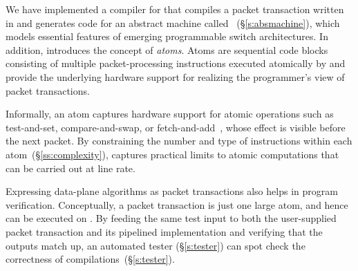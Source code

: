 We have implemented a compiler for \pktlanguage that compiles a packet
transaction written in \pktlanguage and generates code for an abstract machine
called \absmachine~(\S\ref{s:absmachine}), which models essential features of
emerging programmable switch architectures.  In addition, \absmachine
introduces the concept of {\em atoms}. Atoms are sequential code blocks
consisting of multiple packet-processing instructions executed atomically by
\absmachine and provide the underlying hardware support for realizing the
programmer's view of packet transactions.

Informally, an atom captures hardware support for atomic operations such as
test-and-set, compare-and-swap, or fetch-and-add~\cite{faa}, whose effect is
visible before the next packet. By constraining the number and type of
instructions within each atom~(\S\ref{ss:complexity}), \absmachine captures
practical limits to atomic computations that can be carried out at line rate.



Expressing data-plane algorithms as packet transactions also helps in program
verification.  Conceptually, a packet transaction is just one large atom, and
hence can be executed on \absmachine.  By feeding the same test input to both
the user-supplied packet transaction and its pipelined implementation and
verifying that the outputs match up, an automated tester (\S\ref{s:tester}) can
spot check the correctness of compilations~(\S\ref{s:tester}).

